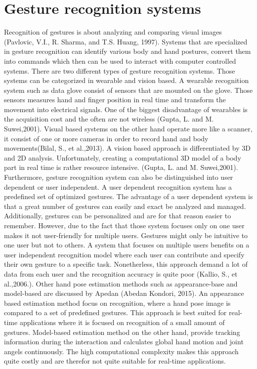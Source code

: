 


\section{Gesture recognition systems}
\label{sec:handfreesensor}
Recognition of gestures is about analyzing and comparing visual images (Pavlovic, V.I., R. Sharma, and T.S. Huang, 1997). Systems that are specialized in gesture recognition can identify various body and hand postures, convert them into commands which then can be used to interact with computer controlled systems.
There are two different types of gesture recognition systems. Those systems can be categorized in wearable and vision based. A wearable recognition system such as data glove consist of sensors that are mounted on the glove. Those sensors measures hand and finger position in real time and transform the movement into electrical signals. One of the biggest disadvantage of wearables is the acquisition cost and the often are not wireless (Gupta, L. and M. Suwei,2001). Visual based systems on the other hand operate more like a scanner, it consist of one or more cameras in order to record hand and body movements(Bilal, S., et al.,2013). A vision based approach is differentiated by 3D and 2D analysis. Unfortunately, creating a computational 3D model of a body part in real time is rather resource intensive. (Gupta, L. and M. Suwei,2001). Furthermore, gesture recognition system can also be distinguished into user dependent or user independent. A user dependent recognition system has a predefined set of optimized gestures. The advantage of a user dependent system is that a great number of gestures can easily and exact be analyzed and managed. Additionally, gestures can be personalized and are for that reason easier to remember. However, due to the fact that those system focuses only on one user makes it not user-friendly for multiple users. 
Gestures might only be intuitive to one user but not to others. A system that focuses on multiple users benefits on a user independent recognition model where each user can contribute and specify their own gesture to a specific task. Nonetherless, this approach demand a lot of data from each user and the recognition accuracy is quite poor (Kallio, S., et al.,2006.).
Other hand pose estimation methods such as  appearance-base and model-based are discussed by Apedan (Abedan Kondori, 2015). An appearance based estimation method focus on recognition, where a hand pose image is compared to a set of predefined gestures. This approach is best suited for real-time applications where it is focused on recognition of a small amount of gestures. Model-based estimation method on the other hand, provide tracking information during the interaction and calculates global hand motion and joint angels continuously. The high computational complexity makes this approach quite costly and are therefor not quite suitable for real-time applications.



